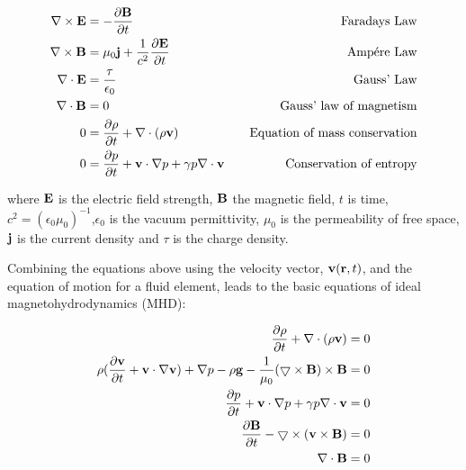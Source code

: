 \begin{align}
	\nabla \times \mathbf{E} &= -\frac{\partial \mathbf{B}}{\partial t }  &\quad \textnormal{Faradays Law}\\
	\nabla \times \mathbf{B} &= \mu_0\mathbf{j} + \frac{1}{c^2}\frac{\partial \mathbf{E}}{\partial t } &\quad \textnormal{Amp{\'e}re Law}\\
	\nabla\cdot\mathbf{E} &= \frac{\tau}{\epsilon_0} &\quad \textnormal{Gauss' Law}\\
	\nabla\cdot\mathbf{B} &= 0 & \quad \textnormal{Gauss' law of magnetism}\\
	0 &= \frac{\partial \rho}{\partial t } + \nabla \cdot (\rho\mathbf{v}) & \quad\textnormal{Equation of mass conservation}\\
	0 &= \frac{\partial p}{\partial t } + \mathbf{v}\cdot\nabla p + \gamma p\nabla\cdot\mathbf{v} & \quad \textnormal{Conservation of entropy}
\end{align}

\noindent where $\mathbf{E}$ is the electric field strength, $\mathbf{B}$ the magnetic field, $t$ is time, $c^2 = (\epsilon_0\mu_0)^{-1}$,$\epsilon_0$ is the vacuum permittivity, $\mu_0$ is the permeability of free space, $\mathbf{j}$ is the current density and $\tau$ is the charge density.


Combining the equations above using the velocity vector, $\mathbf{v}(\mathbf{r},t)$, and the equation of motion for a fluid element, leads to the basic equations of ideal magnetohydrodynamics (MHD):

\begin{align}
	\frac{\partial \rho}{\partial t } + \nabla\cdot(\rho\mathbf{v}) &= 0 \\
	\rho(\frac{\partial \mathbf{v}}{\partial t } + \mathbf{v}\cdot\nabla\mathbf{v}) + \nabla p - \rho\mathbf{g} - \frac{1}{\mu_0}(\bigtriangledown \times \mathbf{B}) \times \mathbf{B} &= 0\\
	\frac{\partial p}{\partial t } + \mathbf{v}\cdot\nabla p + \gamma p\nabla\cdot\mathbf{v} &= 0\\
	\frac{\partial \mathbf{B}}{\partial t } - \bigtriangledown \times (\mathbf{v} \times \mathbf{B}) &= 0\\
	\nabla\cdot\mathbf{B} &= 0
\end{align}

